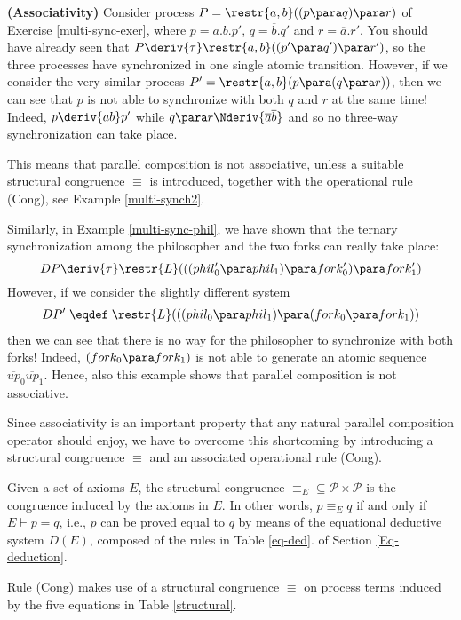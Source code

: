 \begin{example}\label{no-assoc}{\bf (Associativity)}
Consider process $P = \restr{a,b}((p \para q) \para r)$ of Exercise \ref{multi-sync-exer},
where $p = \underline{a}.b.p'$, $q = \overline{b}.q'$ and $r = \overline{a}.r'$. You should have already
seen that  $P \deriv{\tau} \restr{a,b}((p' \para q') \para r')$, so the three processes 
have synchronized in one single atomic transition. However, if we consider the very similar
process $P' = \restr{a,b}(p \para (q \para r))$, then we can see that $p$ is not able to synchronize
with both $q$ and $r$ at the same time! Indeed, $p \deriv{ab}p'$ while $q \para r \Nderiv{\overline{a}\overline{b}}$
and so no three-way synchronization can take place.

This means that parallel composition is not associative, unless a suitable structural congruence $\equiv$ 
is introduced, together with the operational rule (Cong), see Example \ref{multi-synch2}.

Similarly, in Example \ref{multi-sync-phil}, we have shown that the ternary synchronization among
the philosopher and the two forks can really take place:
\[
DP \deriv{\tau}  \restr{L}(((phil'_0\para phil_1) \para fork'_0) \para fork'_1) 
\]
However, if we consider the slightly different system 
\begin{eqnarray*}
DP' \;  \eqdef \;  \restr{L}(((phil_0\para phil_1) \para (fork_0 \para fork_1))
\end{eqnarray*}
then we can see that there is no way for the philosopher to synchronize with both forks! 
Indeed, $(fork_0 \para fork_1)$ is not able to generate an atomic sequence $\overline{up}_0 \overline{up}_1$.
Hence, also this example shows that parallel composition is not associative.
\fine
\end{example}

Since associativity is an important property that
any natural parallel composition operator should enjoy, we have to overcome this shortcoming by introducing
a structural congruence $\equiv$  and an associated operational rule (Cong).

Given a set of axioms $E$, the structural congruence $\equiv_E \subseteq {\mathcal P} \times {\mathcal P}$ is the 
congruence induced by the axioms in $E$. In other words, $p \equiv_E q$ if and only if $E \vdash p = q$, i.e., $p$ can be proved
equal to $q$ by means of the equational deductive system $D(E)$, composed of the rules in Table \ref{eq-ded}.
of Section \ref{Eq-deduction}.

Rule (Cong) makes use of a structural congruence $\equiv$ on process terms induced by the 
five equations in Table \ref{structural}.

